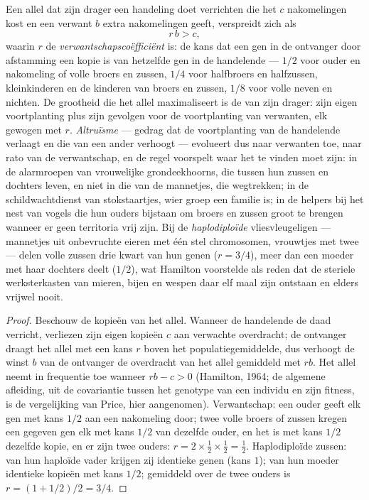 \begin{theorem}\label{thm:b3:behavioural-ecology:hamilton}
Een allel dat zijn drager een handeling doet verrichten die het $c$
nakomelingen kost en een verwant $b$ extra nakomelingen geeft,
verspreidt zich als
\[
r\,b > c ,
\]
waarin $r$ de \emph{verwantschapscoëfficiënt} is: de kans dat een gen
in de ontvanger door afstamming een kopie is van hetzelfde gen in de
handelende --- $1/2$ voor ouder en nakomeling of volle broers en
zussen, $1/4$ voor halfbroers en halfzussen, kleinkinderen en de
kinderen van broers en zussen, $1/8$ voor volle neven en nichten. De
grootheid die het allel maximaliseert is de \emph{}
van zijn drager: zijn eigen voortplanting plus zijn gevolgen voor de
voortplanting van verwanten, elk gewogen met $r$. \emph{Altruïsme} ---
gedrag dat de voortplanting van de handelende verlaagt en die van een
ander verhoogt --- evolueert dus naar verwanten toe, naar rato van de
verwantschap, en de regel voorspelt waar het te vinden moet zijn: in de
alarmroepen van vrouwelijke grondeekhoorns, die tussen hun zussen en
dochters leven, en niet in die van de mannetjes, die wegtrekken; in de
schildwachtdienst van stokstaartjes, wier groep een familie is; in de
helpers bij het nest van vogels die hun ouders bijstaan om broers en
zussen groot te brengen wanneer er geen territoria vrij zijn. Bij de
\emph{haplodiploïde} vliesvleugeligen --- mannetjes uit onbevruchte
eieren met één stel chromosomen, vrouwtjes met twee --- delen volle
zussen drie kwart van hun genen ($r = 3/4$), meer dan een moeder met
haar dochters deelt ($1/2$), wat Hamilton voorstelde als reden dat de
steriele werksterkasten van mieren, bijen en wespen daar elf maal zijn
ontstaan en elders vrijwel nooit.
\end{theorem}
\begin{proof}
Beschouw de kopieën van het allel. Wanneer de handelende de daad
verricht, verliezen zijn eigen kopieën $c$ aan verwachte overdracht; de
ontvanger draagt het allel met een kans $r$ boven het
populatiegemiddelde, dus verhoogt de winst $b$ van de ontvanger de
overdracht van het allel gemiddeld met $rb$. Het allel neemt in
frequentie toe wanneer $rb - c > 0$ (Hamilton, 1964; de algemene
afleiding, uit de covariantie tussen het genotype van een individu en
zijn fitness, is de vergelijking van Price, hier aangenomen).
Verwantschap: een ouder geeft elk gen met kans $1/2$ aan een nakomeling
door; twee volle broers of zussen kregen een gegeven gen elk met kans
$1/2$ van dezelfde ouder, en het is met kans $1/2$ dezelfde kopie, en
er zijn twee ouders: $r = 2\times\tfrac{1}{2}
\times\tfrac{1}{2} = \tfrac{1}{2}$. Haplodiploïde zussen: van hun
haploïde vader krijgen zij identieke genen (kans $1$); van hun moeder
identieke kopieën met kans $1/2$; gemiddeld over de twee ouders is
$r = (1 + 1/2)/2 = 3/4$.
\end{proof}


